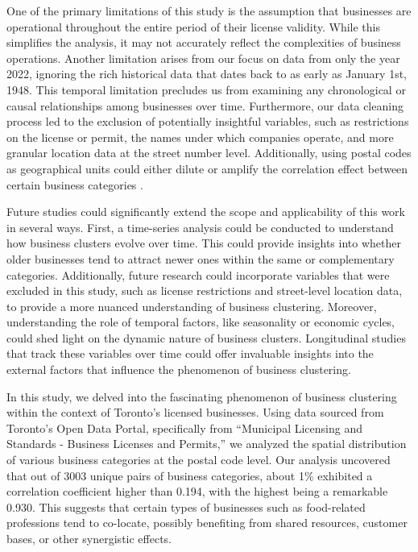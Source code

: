 \documentclass[
]{article}
\begin{document}
One of the primary limitations of this study is the assumption that businesses are operational throughout the entire period of their license validity. While this simplifies the analysis, it may not accurately reflect the complexities of business operations. Another limitation arises from our focus on data from only the year 2022, ignoring the rich historical data that dates back to as early as January 1st, 1948. This temporal limitation precludes us from examining any chronological or causal relationships among businesses over time. Furthermore, our data cleaning process led to the exclusion of potentially insightful variables, such as restrictions on the license or permit, the names under which companies operate, and more granular location data at the street number level. Additionally, using postal codes as geographical units could either dilute or amplify the correlation effect between certain business categories \citep{GRUBESIC2008129}.

Future studies could significantly extend the scope and applicability of this work in several ways. First, a time-series analysis could be conducted to understand how business clusters evolve over time. This could provide insights into whether older businesses tend to attract newer ones within the same or complementary categories. Additionally, future research could incorporate variables that were excluded in this study, such as license restrictions and street-level location data, to provide a more nuanced understanding of business clustering. Moreover, understanding the role of temporal factors, like seasonality or economic cycles, could shed light on the dynamic nature of business clusters. Longitudinal studies that track these variables over time could offer invaluable insights into the external factors that influence the phenomenon of business clustering.

In this study, we delved into the fascinating phenomenon of business clustering within the context of Toronto's licensed businesses. Using data sourced from Toronto's Open Data Portal, specifically from ``Municipal Licensing and Standards - Business Licenses and Permits,'' we analyzed the spatial distribution of various business categories at the postal code level. Our analysis uncovered that out of 3003 unique pairs of business categories, about 1\% exhibited a correlation coefficient higher than 0.194, with the highest being a remarkable 0.930. This suggests that certain types of businesses such as food-related professions tend to co-locate, possibly benefiting from shared resources, customer bases, or other synergistic effects.
\end{document}
